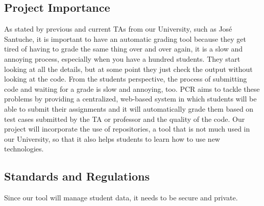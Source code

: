 \subsection{Project Importance}

As stated by previous and current TAs from our University, such as José Santuche, it is important to have an automatic grading tool because they get tired of having to grade the same thing over and over again, it is a slow and annoying process, especially when you have a hundred students. They start looking at all the details, but at some point they just check the output without looking at the code. From the students perspective, the process of submitting code and waiting for a grade is slow and annoying, too.  PCR aims to tackle these problems by providing a centralized, web-based system in which students will be able to submit their assignments and it will automatically grade them based on test cases submitted by the TA or professor and the quality of the code. Our project will incorporate the use of repositories, a tool that is not much used in our University, so that it also helps students to learn how to use new technologies.

\subsection{Standards and Regulations}

Since our tool will manage student data, it needs to be secure and private. 